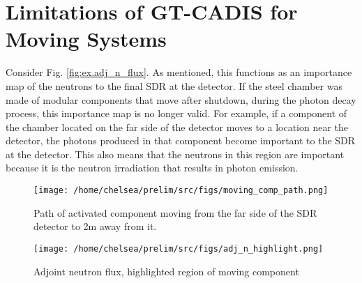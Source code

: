 


\section{Limitations of GT-CADIS for Moving Systems}

Consider Fig. \ref{fig:ex.adj_n_flux}.  As mentioned, this functions as an
importance map of the neutrons to the final SDR at the detector.  If the steel
chamber was made of modular components that move after shutdown, during the
photon decay process, this importance map is no longer valid.  For example, if
a component of the chamber located on the far side of the detector moves to a
location near the detector, the photons produced in that component become
important to the SDR at the detector.  This also means that the neutrons in
this region are important because it is the neutron irradiation that results
in photon emission.

\begin{figure} 
	\texttt{[image: /home/chelsea/prelim/src/figs/moving\_comp\_path.png]}
	\caption[Path of moving component]
	{Path of activated component moving from the far side of the SDR
	detector to 2m away from it.\label{fig:path}}
\end{figure}

\begin{figure} 
	\texttt{[image: /home/chelsea/prelim/src/figs/adj\_n\_highlight.png]}
	\caption[Adjoint neutron flux, highlighted region of moving component]
	{Adjoint neutron flux, highlighted region of moving component
	\label{fig:highlight}}
\end{figure}


